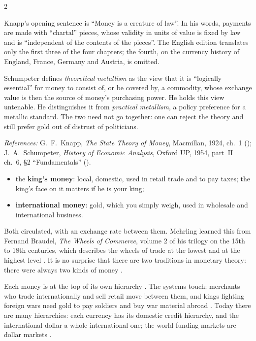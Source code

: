 \begin{paracol}{2}
\begin{history}
Knapp's opening sentence is ``Money is a creature of law''. In his words, payments are made with ``chartal'' pieces, whose validity in units of value is fixed by law and is ``independent of the contents of the pieces''. The English edition translates only the first three of the four chapters; the fourth, on the currency history of England, France, Germany and Austria, is omitted.

Schumpeter defines \emph{theoretical metallism} as the view that it is ``logically essential'' for money to consist of, or be covered by, a commodity, whose exchange value is then the source of money's purchasing power. He holds this view untenable. He distinguishes it from \emph{practical metallism}, a policy preference for a metallic standard. The two need not go together: one can reject the theory and still prefer gold out of distrust of politicians.\par
\emph{References:} G.~F.~Knapp, \emph{The State Theory of Money}, Macmillan, 1924, ch.~1 (); J.~A.~Schumpeter, \emph{History of Economic Analysis}, Oxford UP, 1954, part~II ch.~6, \S2 ``Fundamentals'' ().
\end{history}

\begin{itemize}
  \item the \textbf{king's money}: local, domestic, used in retail trade and to pay taxes; the king's face on it matters if he is your king;
  \item \textbf{international money}: gold, which you simply weigh, used in wholesale and international business.
\end{itemize}
Both circulated, with an exchange rate between them. Mehrling learned this from Fernand Braudel, \emph{The Wheels of Commerce}, volume 2 of his trilogy on the
15th to 18th centuries, which describes the wheels of trade at the lowest and at the highest level . It is no surprise that there are
two traditions in monetary theory: there were always two kinds of money .

\begin{taccts}
\qquad
{}
\end{taccts}
Each money is at the top of its own hierarchy . The systems touch: merchants who trade internationally and sell retail move between them,
and kings fighting foreign wars need gold to pay soldiers and buy war material abroad . Today there are many hierarchies: each currency has its
domestic credit hierarchy, and the international dollar a whole international one; the world funding markets are dollar markets .


\end{paracol}
